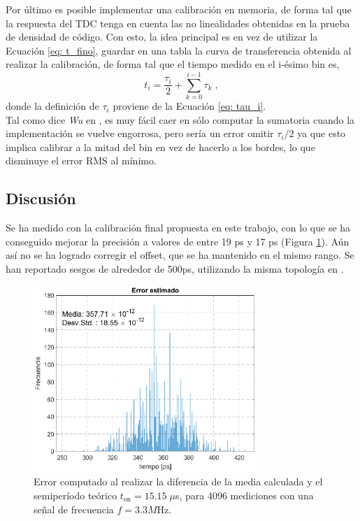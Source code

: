 Por último es posible implementar una calibración en memoria, de forma tal que la respuesta del TDC
tenga en cuenta las no linealidades obtenidas en la prueba de densidad de código. Con esto, la idea principal es
en vez de utilizar la Ecuación \ref{eq: t_fino}, guardar en una tabla la curva de transferencia obtenida
al realizar la calibración, de forma tal que el tiempo medido en el i-ésimo bin es,
\begin{equation*}
     t_i = \dfrac{\tau_i}{2} + \sum_{k=0}^{i-1} \tau_k \; ,
\end{equation*}
donde la definición de $\tau_i$ proviene de la Ecuación \ref{eq: tau_i}. \\
Tal como dice \textit{Wu} en \cite{Wu2010}, es muy fácil caer en sólo computar la sumatoria cuando
la implementación se vuelve engorrosa, pero sería un error omitir $\tau_i/2$ ya que esto implica calibrar
a la mitad del bin en vez de hacerlo a los bordes, lo que disminuye el error RMS al mínimo.

\subsection{Discusión}
Se ha medido con la calibración final propuesta en este trabajo, con lo que se ha conseguido mejorar
la precisión a valores de entre 19 ps y 17 ps (Figura \ref{fig: medicion_final}). Aún así no se ha logrado 
corregir el offset, que se ha mantenido en el mismo rango. Se han reportado sesgos de alrededor de 500ps,
utilizando la misma topología en \cite{machado_readout_2020}. \\

\begin{figure}[H]
      \centering
      \includegraphics[width=0.75\textwidth]{imagenes/Medicion_final.eps}
      \caption{Error computado al realizar la diferencia de la media calculada y el semiperíodo 
      teórico $t_\text{on} = 15.15\;\mu$s, para 4096 mediciones con una señal de frecuencia $f=3.3M$Hz.}
      \label{fig: medicion_final}
\end{figure}

